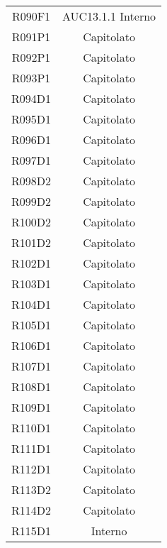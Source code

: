 \documentclass[../analisi-dei-requisiti.tex]{subfiles}
\begin{document}
\begin{longtable}[H]{c|c}
  R090F1                               & AUC13.1.1 Interno             \\
  R091P1                               & Capitolato                    \\
  R092P1                               & Capitolato                    \\
  R093P1                               & Capitolato                    \\
  R094D1                               & Capitolato                    \\
  R095D1                               & Capitolato                    \\
  R096D1                               & Capitolato                    \\
  R097D1                               & Capitolato                    \\
  R098D2                               & Capitolato                    \\
  R099D2                               & Capitolato                    \\
  R100D2                               & Capitolato                    \\
  R101D2                               & Capitolato                    \\
  R102D1                               & Capitolato                    \\
  R103D1                               & Capitolato                    \\
  R104D1                               & Capitolato                    \\
  R105D1                               & Capitolato                    \\
  R106D1                               & Capitolato                    \\
  R107D1                               & Capitolato                    \\
  R108D1                               & Capitolato                    \\
  R109D1                               & Capitolato                    \\
  R110D1                               & Capitolato                    \\
  R111D1                               & Capitolato                    \\
  R112D1                               & Capitolato                    \\
  R113D2                               & Capitolato                    \\
  R114D2                               & Capitolato                    \\
  R115D1                               & Interno                       \\
\end{longtable}
\end{document}
